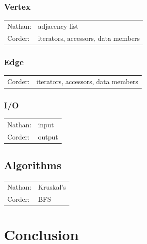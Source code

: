 \documentclass[titlepage]{article}
\begin{document}
\begin{multicols*}{2}
            \subsubsection{Vertex}
                \begin{tabular}{l l}
                    Nathan: & adjacency list \\
                    Corder: & iterators, accessors, data members
                \end{tabular}
            \subsubsection{Edge}
                \begin{tabular}{l l}
                Corder: & iterators, accessors, data members
                \end{tabular}
            \subsubsection{I/O}
                \begin{tabular}{l l}
                   Nathan: & input \\
                   Corder: & output
                \end{tabular}
            \subsection{Algorithms}
                \begin{tabular}{l l}
                    Nathan: & Kruskal's \\
                    Corder: & BFS
                \end{tabular}
        \section{Conclusion}
    \end{multicols*}
\end{document}
